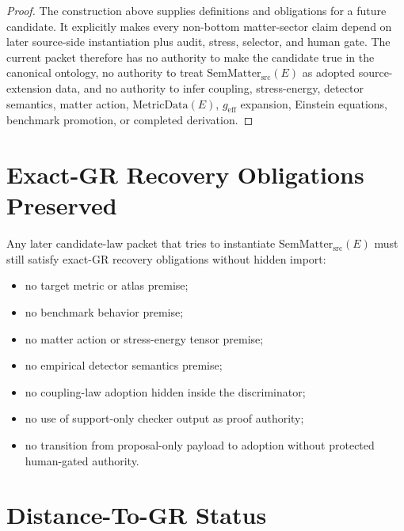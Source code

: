 \documentclass[11pt]{article}
\newcommand{\SemMatterSrc}{\mathrm{SemMatter}_{\mathrm{src}}}
\newcommand{\MetricData}{\mathrm{MetricData}}
\newcommand{\geff}{g_{\mathrm{eff}}}
\begin{document}
\begin{proof}
The construction above supplies definitions and obligations for a future
candidate.  It explicitly makes every non-bottom matter-sector claim depend on
later source-side instantiation plus audit, stress, selector, and human gate.
The current packet therefore has no authority to make the candidate true in
the canonical ontology, no authority to treat \(\SemMatterSrc(E)\) as adopted
source-extension data, and no authority to infer coupling, stress-energy,
detector semantics, matter action, \(\MetricData(E)\), \(\geff\) expansion,
Einstein equations, benchmark promotion, or completed derivation.
\end{proof}

\section{Exact-GR Recovery Obligations Preserved}

Any later candidate-law packet that tries to instantiate \(\SemMatterSrc(E)\)
must still satisfy exact-GR recovery obligations without hidden import:

\begin{itemize}
\item no target metric or atlas premise;
\item no benchmark behavior premise;
\item no matter action or stress-energy tensor premise;
\item no empirical detector semantics premise;
\item no coupling-law adoption hidden inside the discriminator;
\item no use of support-only checker output as proof authority;
\item no transition from proposal-only payload to adoption without protected
  human-gated authority.
\end{itemize}

\section{Distance-To-GR Status}
\end{document}
